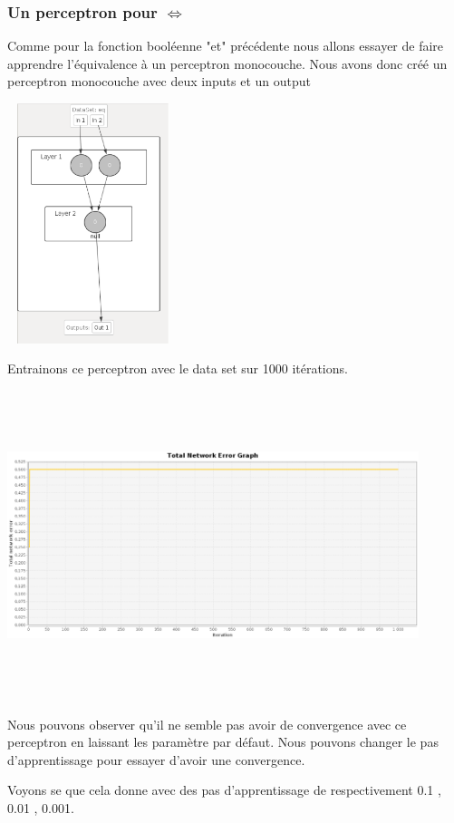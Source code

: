 \documentclass[twoside,openright,a4paper,11pt,french]{article}
\begin{document}
\subsubsection{Un perceptron pour $\Leftrightarrow$}

Comme pour la fonction booléenne "et" précédente nous allons essayer de faire apprendre
l'équivalence à un perceptron monocouche. Nous avons donc créé un perceptron monocouche
avec deux inputs et un output

\includegraphics[width=5cm,height=7cm]{./pics/eq/perceptron_mono.eps}

Entrainons ce perceptron avec le data set sur 1000 itérations.

\includegraphics[width=12cm,height=9cm]{./pics/eq/mono_eq_def.eps}

Nous pouvons observer qu'il ne semble pas avoir de convergence avec ce perceptron
en laissant les paramètre par défaut.
Nous pouvons changer le pas d'apprentissage pour essayer d'avoir
une convergence.

Voyons se que cela donne avec des pas d'apprentissage de respectivement 0.1 , 0.01 , 0.001.
 
\end{document}
